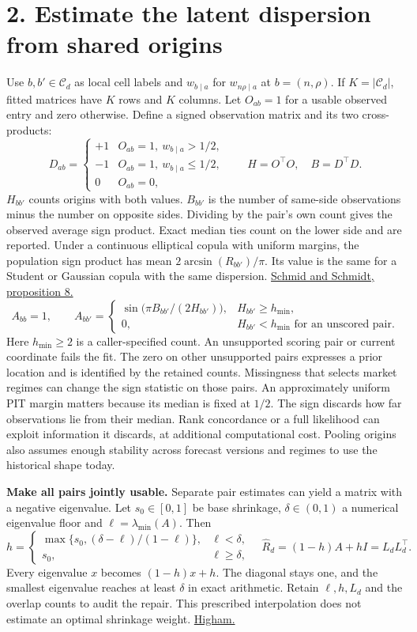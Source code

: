 \documentclass[11pt,letterpaper]{article}
\newcommand{\sect}[1]{\section*{\color{ink}#1}}
\newcommand{\lead}[1]{\textbf{\textcolor{accent}{#1}}}
\newcommand{\wc}{w_{n\rho\mid a}}
\newcommand{\ord}{\mathcal C_d}
\newcommand{\src}[2]{\href{#1}{#2}}
\begin{document}
\newpage
\sect{2. Estimate the latent dispersion from shared origins}
Use \(b,b'\in\ord\) as local cell labels and \(w_{b\mid a}\) for \(\wc\) at \(b=(n,\rho)\). If \(K=|\ord|\), fitted matrices have \(K\) rows and \(K\) columns. Let \(O_{ab}=1\) for a usable observed entry and zero otherwise. Define a signed observation matrix and its two cross-products:
\[
 D_{ab}=\begin{cases}
 +1 & O_{ab}=1,\ w_{b\mid a}>1/2,\\
 -1 & O_{ab}=1,\ w_{b\mid a}\le1/2,\\
 0 & O_{ab}=0,
 \end{cases}
 \qquad H=O^\top O,\quad B=D^\top D .
\]
\(H_{bb'}\) counts origins with both values. \(B_{bb'}\) is the number of same-side observations minus the number on opposite sides. Dividing by the pair's own count gives the observed average sign product. Exact median ties count on the lower side and are reported. Under a continuous elliptical copula with uniform margins, the population sign product has mean \(2\arcsin(R_{bb'})/\pi\). Its value is the same for a Student or Gaussian copula with the same dispersion. \src{https://wisostat.uni-koeln.de/fileadmin/sites/statistik/pdf_publikationen/SchmidSchmidtBlomqvistsBeta.pdf}{Schmid and Schmidt, proposition 8.}
\[
 A_{bb}=1,\qquad
 A_{bb'}=
 \begin{cases}
 \sin\!\bigl(\pi B_{bb'}/(2H_{bb'})\bigr),&H_{bb'}\ge h_{\min},\\
 0,& H_{bb'}< h_{\min}\text{ for an unscored pair}.
 \end{cases}
\]
Here \(h_{\min}\ge2\) is a caller-specified count. An unsupported scoring pair or current coordinate fails the fit. The zero on other unsupported pairs expresses a prior location and is identified by the retained counts. Missingness that selects market regimes can change the sign statistic on those pairs. An approximately uniform PIT margin matters because its median is fixed at \(1/2\). The sign discards how far observations lie from their median. Rank concordance or a full likelihood can exploit information it discards, at additional computational cost. Pooling origins also assumes enough stability across forecast versions and regimes to use the historical shape today.

\lead{Make all pairs jointly usable.} Separate pair estimates can yield a matrix with a negative eigenvalue. Let \(s_0\in[0,1]\) be base shrinkage, \(\delta\in(0,1)\) a numerical eigenvalue floor and \(\ell=\lambda_{\min}(A)\). Then
\[
 h=\begin{cases}
 \max\{s_0,(\delta-\ell)/(1-\ell)\},&\ell<\delta,\\
 s_0,&\ell\ge\delta ,
 \end{cases}\quad
 \widehat R_d=(1-h)A+hI=L_dL_d^\top .
\]
Every eigenvalue \(x\) becomes \((1-h)x+h\). The diagonal stays one, and the smallest eigenvalue reaches at least \(\delta\) in exact arithmetic. Retain \(\ell,h,L_d\) and the overlap counts to audit the repair. This prescribed interpolation does not estimate an optimal shrinkage weight. \src{https://doi.org/10.1093/imanum/22.3.329}{Higham.}
\end{document}
